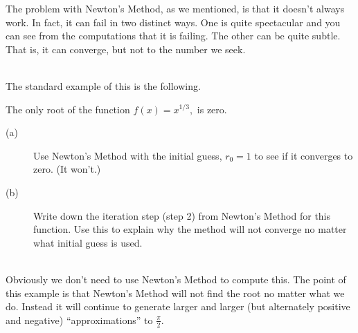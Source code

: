 The problem with Newton's Method, as we mentioned, is that it doesn't
always work. In fact, it can fail in two distinct ways. One is quite
spectacular and you can see from the computations that it is
failing. The other can be quite subtle. That is, it can converge, but
not to the number we seek.


\\
The standard example of this is the following.
\begin{embeddedproblem}{}
  The only root of the function $f(x)=x^{1/3},$ is zero.  
  \begin{description}
  \item[(a)] Use Newton's Method with the initial guess, $r_0=1$ to
    see if it converges to zero. (It won't.)
  \item[(b)] Write down the iteration step (step 2) from Newton's
    Method for this function. Use this to explain why the method will
    not converge no matter what initial guess is used.
  \end{description}
\end{embeddedproblem}\\
Obviously we don't need to use Newton's Method to compute this. The
point of this example is that Newton's Method will not find the root
no matter what we do. Instead it will continue to generate larger and
larger (but alternately positive and negative) ``approximations'' to
$\frac{\pi}{2}.$

